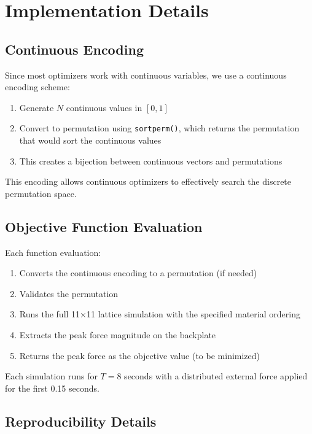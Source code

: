 \documentclass[11pt,a4paper]{article}
\begin{document}
\section{Implementation Details}

\subsection{Continuous Encoding}

\noindent Since most optimizers work with continuous variables, we use a continuous encoding scheme:
\begin{enumerate}
    \item Generate $N$ continuous values in $[0, 1]$
    \item Convert to permutation using \texttt{sortperm()}, which returns the permutation that would sort the continuous values
    \item This creates a bijection between continuous vectors and permutations
\end{enumerate}

\noindent This encoding allows continuous optimizers to effectively search the discrete permutation space. \newline

\subsection{Objective Function Evaluation}

\noindent Each function evaluation:
\begin{enumerate}
    \item Converts the continuous encoding to a permutation (if needed)
    \item Validates the permutation
    \item Runs the full 11×11 lattice simulation with the specified material ordering
    \item Extracts the peak force magnitude on the backplate
    \item Returns the peak force as the objective value (to be minimized)
\end{enumerate}

\noindent Each simulation runs for $T = 8$ seconds with a distributed external force applied for the first 0.15 seconds. \newline

\subsection{Reproducibility Details}
\end{document}
